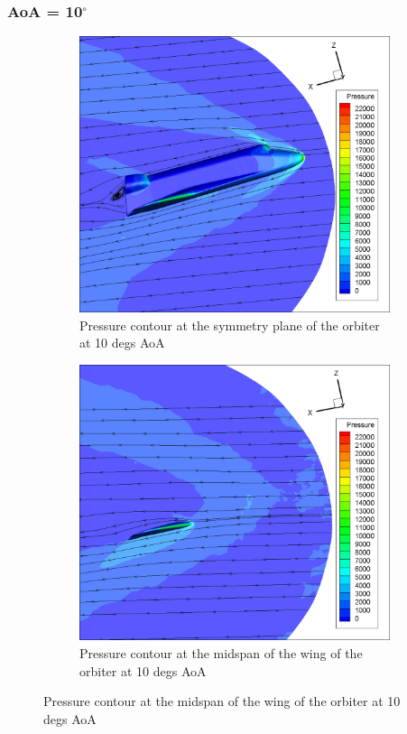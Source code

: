 \subsubsection{AoA = 10$^\circ$}
\begin{figure}[H]

	\centering
    \begin{subfigure}[b]{0.65\textwidth}
         \centering
		 \includegraphics[width=\textwidth]{report_images/10_sym_pressure_contour.png}
		 \caption{Pressure contour at the symmetry plane of the orbiter at 10 degs AoA}
		 \label{fig: 10_sym_pressure_contour}
    \end{subfigure} 
    \begin{subfigure}[b]{0.65\textwidth}
         \centering
		 \includegraphics[width=\textwidth]{report_images/10_wing_pressure_contour.png}
		 \caption{Pressure contour at the midspan of the wing of the orbiter at 10 degs AoA}
		 \label{fig: 10_wing_pressure_contour}
    \end{subfigure}
\end{figure}

